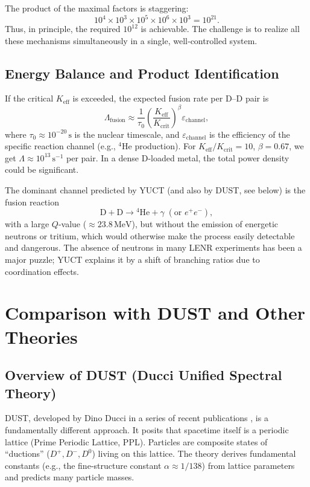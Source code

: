 \documentclass[12pt]{article}
\theoremstyle{remark}
\newcommand{\Keff}{K_{\mathrm{eff}}}
\newcommand{\Kcrit}{K_{\mathrm{crit}}}
\begin{document}
	The product of the maximal factors is staggering:
	\[
	10^4 \times 10^3 \times 10^5 \times 10^6 \times 10^3 = 10^{21}.
	\]
	Thus, in principle, the required \(10^{12}\) is achievable. The challenge is to realize all these mechanisms simultaneously in a single, well‑controlled system.
	
	\subsection{Energy Balance and Product Identification}
	
	If the critical \(\Keff\) is exceeded, the expected fusion rate per D–D pair is
	\begin{equation}
		\Lambda_{\text{fusion}} \approx \frac{1}{\tau_0} \left( \frac{\Keff}{\Kcrit} \right)^{\beta} \varepsilon_{\text{channel}},
		\label{eq:fusion-rate}
	\end{equation}
	where \(\tau_0 \approx 10^{-20}\,\text{s}\) is the nuclear timescale, and \(\varepsilon_{\text{channel}}\) is the efficiency of the specific reaction channel (e.g., \(^4\)He production). For \(\Keff/\Kcrit = 10\), \(\beta = 0.67\), we get \(\Lambda \approx 10^{13}\,\text{s}^{-1}\) per pair. In a dense D‑loaded metal, the total power density could be significant.
	
	The dominant channel predicted by YUCT (and also by DUST, see below) is the fusion reaction
	\[
	\mathrm{D} + \mathrm{D} \to {}^4\mathrm{He} + \gamma\;(\text{or } e^+e^-),
	\]
	with a large \(Q\)-value (\(\approx 23.8\,\text{MeV}\)), but without the emission of energetic neutrons or tritium, which would otherwise make the process easily detectable and dangerous. The absence of neutrons in many LENR experiments has been a major puzzle; YUCT explains it by a shift of branching ratios due to coordination effects.
	
	\section{Comparison with DUST and Other Theories}
	\label{sec:comparison}
	
	\subsection{Overview of DUST (Ducci Unified Spectral Theory)}
	
	DUST, developed by Dino Ducci in a series of recent publications \cite{Ducci2025,Ducci2026a,Ducci2026b}, is a fundamentally different approach. It posits that spacetime itself is a periodic lattice (Prime Periodic Lattice, PPL). Particles are composite states of “ductions” (\(D^+, D^-, D^0\)) living on this lattice. The theory derives fundamental constants (e.g., the fine‑structure constant \(\alpha \approx 1/138\)) from lattice parameters and predicts many particle masses.
	
\end{document}
